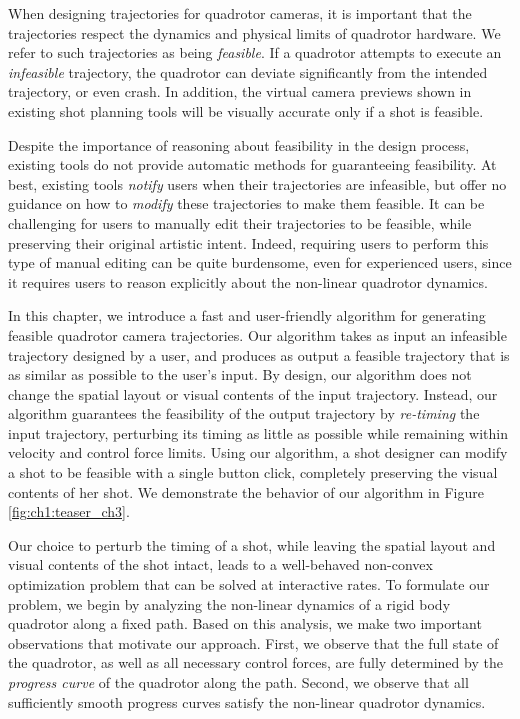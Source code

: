 
\label{sec:ch3}

When designing trajectories for quadrotor cameras, it is important that the  trajectories respect the dynamics and physical limits of quadrotor hardware.
We refer to such trajectories as being \emph{feasible}.
If a quadrotor attempts to execute an \emph{infeasible}  trajectory, 
the quadrotor can deviate significantly from the intended trajectory, or even crash.
In addition, the virtual camera previews shown in existing shot planning tools will be visually accurate only if a shot is feasible.

Despite the importance of reasoning about feasibility in the design process, existing tools do not provide automatic methods for guaranteeing feasibility.
At best, existing tools \emph{notify} users when their trajectories are infeasible, but offer no guidance on how to \emph{modify} these trajectories to make them feasible.
It can be challenging for users to manually edit their trajectories to be feasible,  while preserving their original artistic intent. Indeed, requiring users to perform this type of manual editing can be quite burdensome, even for experienced users, since it requires users to reason explicitly about the non-linear quadrotor dynamics.

In this chapter, we introduce a fast and user-friendly algorithm for generating feasible quadrotor camera trajectories.
Our algorithm takes as input an infeasible trajectory designed by a user, and produces as output a feasible trajectory that is as similar as possible to the user's input.
By design, our algorithm does not change the spatial layout or  visual contents of the input trajectory.
Instead, our algorithm guarantees the feasibility of the output trajectory by \emph{re-timing} the input trajectory, perturbing its timing as little as possible while remaining within velocity and control force limits.
Using our algorithm, a shot designer can modify a shot to be feasible with a single button click, completely preserving the visual contents of her shot.
We demonstrate the behavior of our algorithm in Figure \ref{fig:ch1:teaser_ch3}.

Our choice to perturb the timing of a shot, while leaving the spatial layout and visual contents of the shot intact, leads to a well-behaved non-convex optimization problem that can be solved at interactive rates.
To formulate our problem, we begin by analyzing the non-linear dynamics of a rigid body quadrotor along a fixed path.
Based on this analysis, we make two important observations that motivate our approach.
First, we observe that the full state of the quadrotor, as well as all necessary control forces, are fully determined by the \emph{progress curve} of the quadrotor along the path.
Second, we observe that all sufficiently smooth progress curves satisfy the non-linear quadrotor dynamics.

